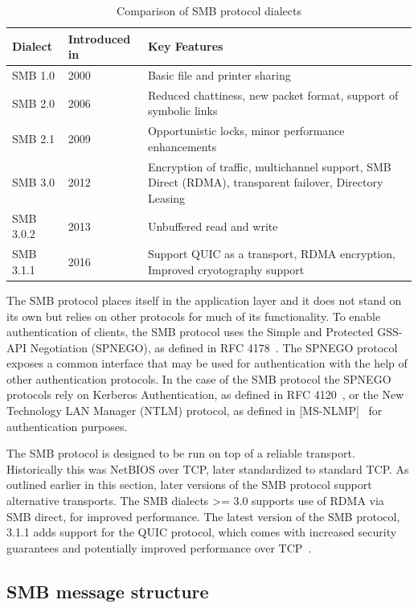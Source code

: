\documentclass[english, 12pt, a4paper, elec, utf8, a-2b, online]{aaltothesis}
\begin{document}
\begin{table}[h]
\centering
\caption{Comparison of SMB protocol dialects}
\label{tab:smb_dialects}
\begin{tabular}{|l|p{5cm}|p{5cm}|}
\hline
\textbf{Dialect} & \textbf{Introduced in} & \textbf{Key Features}\\ \hline
SMB 1.0 & 2000 & Basic file and printer sharing \\ \hline
SMB 2.0 & 2006 & Reduced chattiness, new packet format, support of symbolic links \\ \hline
SMB 2.1 & 2009 & Opportunistic locks, minor performance enhancements \\ \hline
SMB 3.0 & 2012 & Encryption of traffic, multichannel support, SMB Direct (RDMA), transparent failover, Directory Leasing \\ \hline
SMB 3.0.2 & 2013 & Unbuffered read and write \\ \hline
SMB 3.1.1 & 2016 & Support QUIC as a transport, RDMA encryption, Improved cryotography support \\ \hline
\end{tabular}
\end{table}

The SMB protocol places itself in the application layer and it does not stand on its
own but relies on other protocols for much of its functionality. To enable authentication
of clients, the SMB protocol uses the Simple and Protected GSS-API Negotiation (SPNEGO), as
defined in RFC 4178~\cite{rfc4178}. The SPNEGO protocol exposes a common interface
that may be used for authentication with the help of other authentication protocols.
In the case of the SMB protocol the SPNEGO protocols rely on Kerberos Authentication, as
defined in RFC 4120~\cite{rfc4120}, or the New Technology LAN Manager (NTLM) protocol,
as defined in {[MS-NLMP]}~\cite{ntlm_tech} for authentication purposes.

The SMB protocol is designed to be run on top of a reliable transport. Historically
this was NetBIOS over TCP, later standardized to standard TCP. As outlined earlier
in this section, later versions of the SMB protocol support alternative transports. The
SMB dialects >= 3.0 supports use of RDMA via SMB direct, for improved performance.
The latest version of the SMB protocol, 3.1.1 adds support for the QUIC protocol,
which comes with increased security guarantees and potentially improved performance
over TCP~\cite{smb2_tech}.

\subsection{SMB message structure}
\end{document}
